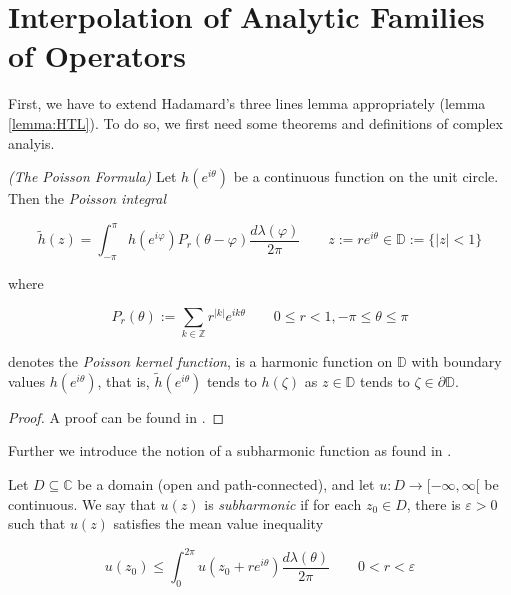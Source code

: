 \section{Interpolation of Analytic Families of Operators}
First, we have to extend Hadamard's three lines lemma appropriately (lemma \ref{lemma:HTL}). To do so, we first need some theorems and definitions of complex analyis.

\vspace{2mm}

\begin{mdframed}
	\begin{theorem}\emph{(The Poisson Formula)}
		Let $h(e^{i\theta})$ be a continuous function on the unit circle. Then the \emph{Poisson integral} 

		\begin{equation*}
			\tilde{h}\left( z \right) = \int_{-\pi}^{\pi} h\left( e^{i\varphi} \right) P_r\left( \theta - \varphi \right)\frac{d \lambda(\varphi)}{2\pi} \qquad z := re^{i\theta} \in \mathbb{D} := \{\vert z \vert < 1\}	
		\end{equation*}

		where 

		\begin{equation}
			P_r(\theta) := \sum\limits_{k \in \mathbb{Z}} r^{\vert k \vert} e^{ik\theta} \qquad 0 \leqslant r < 1, -\pi \leqslant \theta \leqslant \pi
		\end{equation}

		denotes the \emph{Poisson kernel function}, is a harmonic function on $\mathbb{D}$ with boundary values $h\left( e^{i\theta} \right)$, that is, $\tilde{h}\left( e^{i\theta} \right)$ tends to $h\left( \zeta \right)$ as $z \in \mathbb{D}$ tends to $\zeta \in \partial\mathbb{D}$.
		\label{thm:poisson}
	\end{theorem}
\end{mdframed}

\begin{proof}
	A proof can be found in \cite[277--278]{gamelin:complex_analysis:2001}.	
\end{proof}

Further we introduce the notion of a subharmonic function as found in \cite[394]{gamelin:complex_analysis:2001}.

\vspace{2mm}

\begin{mdframed}
	\begin{definition}
		Let $D \subseteq \mathbb{C}$ be a domain (open and path-connected), and let $u: D \rightarrow [-\infty,\infty[$ be continuous. We say that $u(z)$ is \emph{subharmonic} if for each $z_0 \in D$, there is $\varepsilon > 0$ such that $u(z)$ satisfies the mean value inequality

			\begin{equation}
				u(z_0) \leqslant \int_0^{2\pi} u\left( z_0 + re^{i\theta} \right) \frac{d\lambda(\theta)}{2\pi} \qquad 0 < r < \varepsilon
			\end{equation}
	\end{definition}
\end{mdframed}

